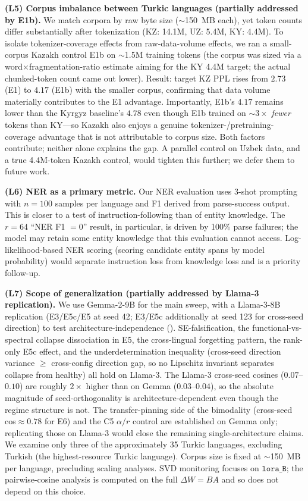 \documentclass[11pt]{article}
\begin{document}
\textbf{(L5) Corpus imbalance between Turkic languages (partially addressed by E1b).} We match corpora by raw byte size ($\sim$150~MB each), yet token counts differ substantially after tokenization (KZ: 14.1M, UZ: 5.4M, KY: 4.4M). To isolate tokenizer-coverage effects from raw-data-volume effects, we ran a small-corpus Kazakh control E1b on $\sim$1.5M training tokens (the corpus was sized via a word$\times$fragmentation-ratio estimate aiming for the KY 4.4M target; the actual chunked-token count came out lower). Result: target KZ PPL rises from $2.73$ (E1) to $4.17$ (E1b) with the smaller corpus, confirming that data volume materially contributes to the E1 advantage. Importantly, E1b's $4.17$ remains lower than the Kyrgyz baseline's $4.78$ even though E1b trained on $\sim 3\times$ \emph{fewer} tokens than KY---so Kazakh also enjoys a genuine tokenizer-/pretraining-coverage advantage that is not attributable to corpus size. Both factors contribute; neither alone explains the gap. A parallel control on Uzbek data, and a true 4.4M-token Kazakh control, would tighten this further; we defer them to future work.

\textbf{(L6) NER as a primary metric.} Our NER evaluation uses 3-shot prompting with $n{=}100$ samples per language and F1 derived from parse-success output. This is closer to a test of instruction-following than of entity knowledge. The $r{=}64$ ``NER F1 $= 0$'' result, in particular, is driven by 100\% parse failures; the model may retain some entity knowledge that this evaluation cannot access. Log-likelihood-based NER scoring (scoring candidate entity spans by model probability) would separate instruction loss from knowledge loss and is a priority follow-up.

\textbf{(L7) Scope of generalization (partially addressed by Llama-3 replication).} We use Gemma-2-9B for the main sweep, with a Llama-3-8B replication (E3/E5c/E5 at seed 42; E3/E5c additionally at seed 123 for cross-seed direction) to test architecture-independence (). SE-falsification, the functional-vs-spectral collapse dissociation in E5, the cross-lingual forgetting pattern, the rank-only E5c effect, and the underdetermination inequality (cross-seed direction variance $\geq$ cross-config direction gap, so no Lipschitz invariant separates collapse from healthy) all hold on Llama-3. The Llama-3 cross-seed cosines ($0.07$--$0.10$) are roughly $2\times$ higher than on Gemma ($0.03$--$0.04$), so the absolute magnitude of seed-orthogonality is architecture-dependent even though the regime structure is not. The transfer-pinning side of the bimodality (cross-seed cos$\approx 0.78$ for E6) and the C5 $\alpha/r$ control are established on Gemma only; replicating those on Llama-3 would close the remaining single-architecture claims. We examine only three of the approximately 35 Turkic languages, excluding Turkish (the highest-resource Turkic language). Corpus size is fixed at $\sim$150~MB per language, precluding scaling analyses. SVD monitoring focuses on $\texttt{lora\_B}$; the pairwise-cosine analysis is computed on the full $\Delta W{=}BA$ and so does not depend on this choice.
\end{document}
